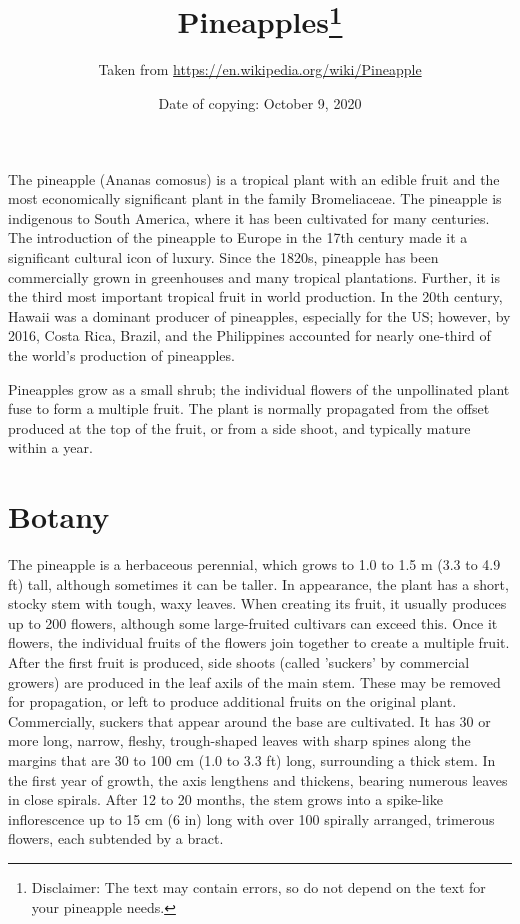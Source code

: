 \documentclass{article}
\title{Pineapples\footnote{Disclaimer: The text may contain errors, so do not depend on the text for your pineapple needs.}}
\author{Taken from \url{https://en.wikipedia.org/wiki/Pineapple}}
\date{Date of copying: October 9, 2020}
\begin{document}
\maketitle

The pineapple (Ananas comosus) is a tropical plant with an edible fruit and the most economically significant plant in the family Bromeliaceae. The pineapple is indigenous to South America, where it has been cultivated for many centuries. The introduction of the pineapple to Europe in the 17th century made it a significant cultural icon of luxury. Since the 1820s, pineapple has been commercially grown in greenhouses and many tropical plantations. Further, it is the third most important tropical fruit in world production. In the 20th century, Hawaii was a dominant producer of pineapples, especially for the US; however, by 2016, Costa Rica, Brazil, and the Philippines accounted for nearly one-third of the world's production of pineapples.

Pineapples grow as a small shrub; the individual flowers of the unpollinated plant fuse to form a multiple fruit. The plant is normally propagated from the offset produced at the top of the fruit, or from a side shoot, and typically mature within a year.

\section{Botany}
The pineapple is a herbaceous perennial, which grows to 1.0 to 1.5 m (3.3 to 4.9 ft) tall, although sometimes it can be taller. In appearance, the plant has a short, stocky stem with tough, waxy leaves. When creating its fruit, it usually produces up to 200 flowers, although some large-fruited cultivars can exceed this. Once it flowers, the individual fruits of the flowers join together to create a multiple fruit. After the first fruit is produced, side shoots (called 'suckers' by commercial growers) are produced in the leaf axils of the main stem. These may be removed for propagation, or left to produce additional fruits on the original plant. Commercially, suckers that appear around the base are cultivated. It has 30 or more long, narrow, fleshy, trough-shaped leaves with sharp spines along the margins that are 30 to 100 cm (1.0 to 3.3 ft) long, surrounding a thick stem. In the first year of growth, the axis lengthens and thickens, bearing numerous leaves in close spirals. After 12 to 20 months, the stem grows into a spike-like inflorescence up to 15 cm (6 in) long with over 100 spirally arranged, trimerous flowers, each subtended by a bract.
\end{document}
